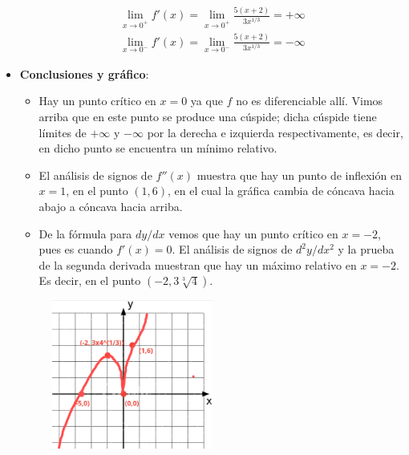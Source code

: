\documentclass[12pt]{article}
\begin{document}
\begin{itemize}
\begin{align*}
    \lim_{x \to 0^+} f'(x) = \lim_{x \to 0^+} \frac{5(x+2)}{3x^{1/3}}  = +\infty \\
    \lim_{x \to 0^-} f'(x) = \lim_{x \to 0^-} \frac{5(x+2)}{3x^{1/3}}  = -\infty 
  \end{align*}
\item \textbf{Conclusiones y gráfico}:
  \begin{itemize}
  \item Hay un punto crítico en $x = 0$ ya que $f$ no es diferenciable allí. Vimos arriba que en este punto se produce una cúspide; dicha cúspide tiene límites de $+\infty$ y $-\infty$ por la derecha e izquierda respectivamente, es decir, en dicho punto se encuentra un mínimo relativo.
  \item El análisis de signos de $f''(x)$ muestra que hay un punto de inflexión en $x = 1$, en el punto $(1,6)$, en el cual la gráfica cambia de cóncava hacia abajo a cóncava hacia arriba.
  \item De la fórmula para $dy /dx$ vemos que hay un punto crítico en $x =-2$, pues es cuando $f'(x)=0$. El análisis de signos de $d^2y/dx^2$ y la prueba de la segunda derivada muestran que hay un máximo relativo en $x=-2$. Es decir, en el punto $(-2,3\sqrt[3]{4})$.
  \end{itemize}
\begin{figure}[H]
\centering
\includegraphics[width=0.5\textwidth]{../img/img_Lista3/p2_36.png}
\end{figure}
\end{itemize}
\end{document}
